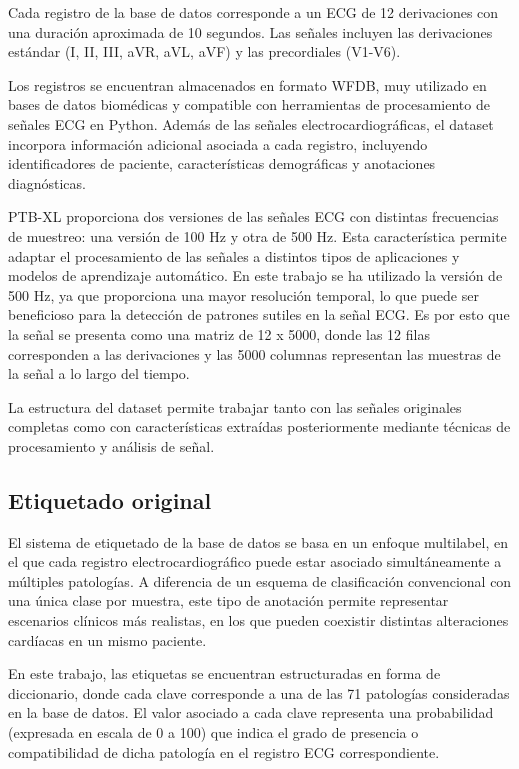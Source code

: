 \documentclass[12pt,a4paper,twoside]{book}
\begin{document}
Cada registro de la base de datos corresponde a un ECG de 12 derivaciones con una duración aproximada de 10 segundos. 
Las señales incluyen las derivaciones estándar (I, II, III, aVR, aVL, aVF) y las precordiales (V1-V6).

Los registros se encuentran almacenados en formato WFDB, muy utilizado en bases de datos biomédicas y compatible con herramientas de procesamiento de señales ECG en Python. 
Además de las señales electrocardiográficas, el dataset incorpora información adicional asociada a cada registro, incluyendo identificadores de paciente, características demográficas y anotaciones diagnósticas.

PTB-XL proporciona dos versiones de las señales ECG con distintas frecuencias de muestreo: una versión de 100 Hz y otra de 500 Hz. 
Esta característica permite adaptar el procesamiento de las señales a distintos tipos de aplicaciones y modelos de aprendizaje automático.
En este trabajo se ha utilizado la versión de 500 Hz, ya que proporciona una mayor resolución temporal, lo que puede ser beneficioso para la detección de patrones sutiles en la señal ECG.
Es por esto que la señal se presenta como una matriz de 12 x 5000, donde las 12 filas corresponden a las derivaciones y las 5000 columnas representan las muestras de la señal a lo largo del tiempo.

La estructura del dataset permite trabajar tanto con las señales originales completas como con características extraídas posteriormente mediante técnicas de procesamiento y análisis de señal.

\subsection{Etiquetado original}

El sistema de etiquetado de la base de datos se basa en un enfoque multilabel, en el que cada registro electrocardiográfico puede estar asociado simultáneamente a múltiples patologías. 
A diferencia de un esquema de clasificación convencional con una única clase por muestra, este tipo de anotación permite representar escenarios clínicos más realistas, en los que pueden coexistir distintas alteraciones cardíacas en un mismo paciente.

En este trabajo, las etiquetas se encuentran estructuradas en forma de diccionario, donde cada clave corresponde a una de las 71 patologías consideradas en la base de datos. 
El valor asociado a cada clave representa una probabilidad (expresada en escala de 0 a 100) que indica el grado de presencia o compatibilidad de dicha patología en el registro ECG correspondiente.
\end{document}
